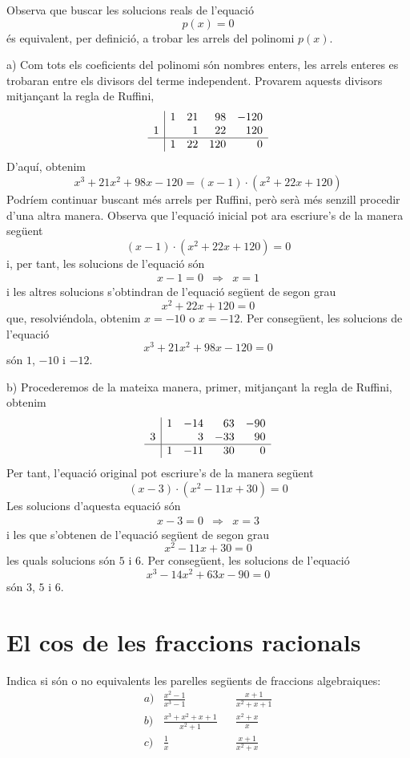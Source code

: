 \begin{solucio}
Observa que buscar les solucions reals de l'equació
\[
p(x)=0
\]és equivalent, per definició, a trobar les arrels del
polinomi $p(x)$.

a) Com tots els coeficients del polinomi són nombres enters, les arrels enteres es trobaran entre els divisors del terme
independent. Provarem aquests divisors mitjançant la regla de Ruffini,\[
\begin{array}{r|rrrr}
& 1 & 21 & 98 & -120 \\
1 & & 1 & 22 & 120 \\\hline
& 1 & 22 & 120 & 0\end{array}\]D'aquí, obtenim\[
x^{3}+21x^{2}+98x-120=(x-1)\cdot (x^{2}+22x+120)
\]Podríem continuar buscant més arrels per Ruffini, però serà més senzill procedir d'una altra manera. Observa que l'equació
inicial pot ara escriure's de la manera següent\[
(x-1)\cdot (x^{2}+22x+120)=0
\]i, per tant, les solucions de l'equació són\[
\begin{array}{ccc}
x-1=0 & \Longrightarrow & x=1\end{array}\]i les altres solucions s'obtindran de l'equació següent de
segon grau
\[
x^{2}+22x+120=0
\]que, resolviéndola, obtenim $x=-10$ o $x=-12$. Per consegüent, les
solucions de l'equació
\[
x^{3}+21x^{2}+98x-120=0
\]són $1$, $-10$ i $-12$.

b) Procederemos de la mateixa manera, primer, mitjançant la regla de Ruffini,
obtenim\[
\begin{array}{r|rrrr}
& 1 & -14 & 63 & -90 \\
3 & & 3 & -33 & 90 \\\hline
& 1 & -11 & 30 & 0\end{array}\]Per tant, l'equació original pot escriure's de la manera següent\[
(x-3)\cdot (x^{2}-11x+30)=0
\]Les solucions d'aquesta equació són\[
\begin{array}{ccc}
x-3=0 & \Longrightarrow & x=3\end{array}\]i les que s'obtenen de l'equació següent de segon grau\[
x^{2}-11x+30=0
\]les quals solucions són $5$ i $6$. Per consegüent, les solucions de l'equació
\[
x^{3}-14x^{2}+63x-90=0
\]són $3$, $5$ i $6$.
\end{solucio}

\section{El cos de les fraccions racionals}

\begin{exercici}
Indica si són o no equivalents les parelles següents de fraccions
algebraiques:\[
\begin{array}{cccc}
a) & \frac{x^{2}-1}{x^{3}-1} & & \frac{x+1}{x^{2}+x+1} \\
b) & \frac{x^{3}+x^{2}+x+1}{x^{2}+1} & & \frac{x^{2}+x}{x} \\
c) & \frac{1}{x} & & \frac{x+1}{x^{2}+x}\end{array}\]
\end{exercici}

